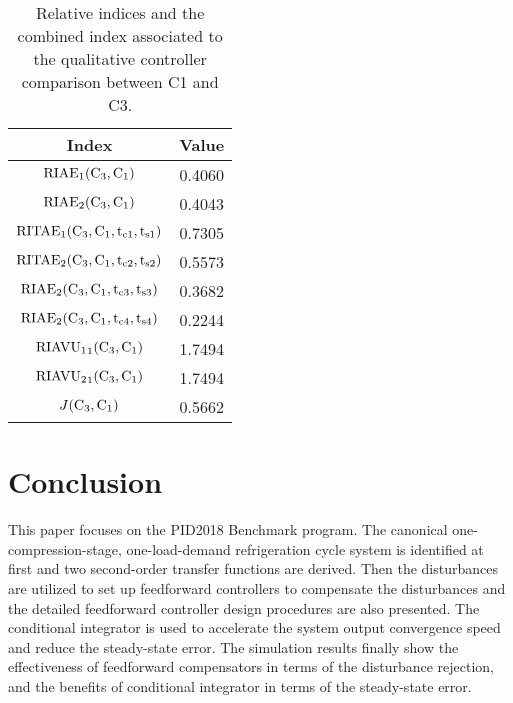 \documentclass{ifacconf}
\begin{document}
\begin{table}[htb]
\begin{center}
\caption{Relative indices and the combined index associated to the qualitative controller
comparison between C1 and C3.}\label{index3}
\begin{tabular}{cc}
Index & Value\\\hline
${\rm{RIAE}}_1({\rm{C_3,C_1}})$ & 0.4060 \\
${\rm{RIAE}}_2({\rm{C_3,C_1}})$ & 0.4043 \\
${\rm{RITAE}}_1({\rm{C_3,C_1,t_{c1},t_{s1}}})$ & 0.7305 \\
${\rm{RITAE}}_2({\rm{C_3,C_1,t_{c2},t_{s2}}})$ & 0.5573 \\
${\rm{RIAE}}_2({\rm{C_3,C_1,t_{c3},t_{s3}}})$ & 0.3682 \\
${\rm{RIAE}}_2({\rm{C_3,C_1,t_{c4},t_{s4}}})$ & 0.2244 \\
${\rm{RIAVU_1}}_1({\rm{C_3,C_1}})$ & 1.7494 \\
${\rm{RIAVU_2}}_1({\rm{C_3,C_1}})$ & 1.7494 \\ \hline
$J({\rm{C_3,C_1}})$ & 0.5662 \\ \hline
\end{tabular}
\end{center}
\end{table}


\section{Conclusion}
This paper focuses on the PID2018 Benchmark program. The canonical one-compression-stage, one-load-demand refrigeration cycle system is identified at first and two second-order transfer functions are derived. Then the disturbances are utilized to set up feedforward controllers to compensate the disturbances and the detailed feedforward controller design procedures are also presented. The conditional integrator is used to accelerate the system output convergence speed and reduce the steady-state error. The simulation results finally show the effectiveness of feedforward compensators in terms of the disturbance rejection, and the benefits of conditional integrator in terms of the steady-state error.



\end{document}
